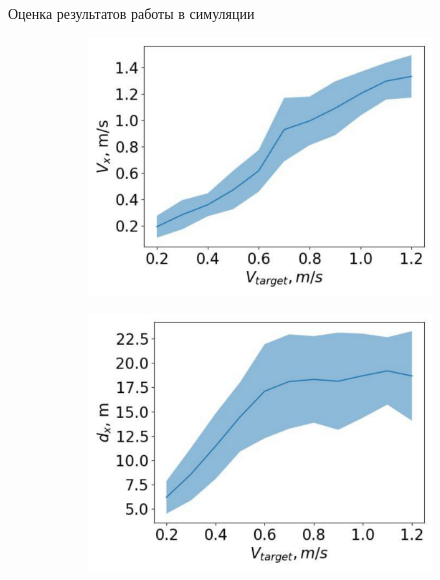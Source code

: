 \begin{frame}{Оценка результатов работы в симуляции}
\begin{figure}[h]
\begin{subfigure}{.5\textwidth}
  \centering
  \includegraphics[width=1\textwidth]{images/vx}
\end{subfigure}%
\begin{subfigure}{.5\textwidth}
  \centering
  \includegraphics[width=1\textwidth]{images/dx}
\end{subfigure}%
\end{figure}
\begin{table} [htbp]
    \centering
    \begin{threeparttable}
        \begin{tabular}{| p{1cm} || p{2cm} | p{2cm} | p{2cm} |p{2cm} |}

\end{tabular}
\end{threeparttable}
\end{table}
\end{frame}

